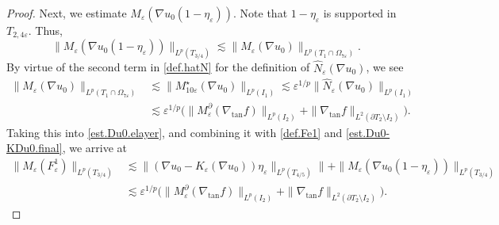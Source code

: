 \documentclass[reqno,12pt]{amsart} %
\theoremstyle{definition}
\theoremstyle{remark}
\numberwithin{equation}{section}
\newcommand{\e}{\varepsilon}
\begin{document}
\begin{proof}
Next, we estimate $M_\e(\nabla u_0(1-\eta_\e))$. Note that $1-\eta_\e$ is supported in 
$T_{2,4\e}$. Thus,
\begin{equation}\label{est.Du0.elayer}
\| M_\e(\nabla u_0(1-\eta_\e)) \|_{L^p(T_{3/4})} \lesssim \| M_\e(\nabla u_0) \|_{L^p(T_{1} \cap \Omega_{7\e})}.
\end{equation}
By virtue of the second term in \eqref{def.hatN} for the definition of $\widehat{N}_\e(\nabla u_0)$, we see
\begin{equation}\label{est.MeDu0Lp}
\begin{aligned}
    \| M_\e(\nabla u_0) \|_{L^p(T_{1} \cap \Omega_{7\e})} & \lesssim \| M_{10\e}^\star(\nabla u_0) \|_{L^p(I_1)} \lesssim \e^{1/p} \| \widehat{N}_\e(\nabla u_0) \|_{L^p(I_1)} \\
    & \lesssim \e^{1/p} \big( \| M_\e^\partial(\nabla_{\tan} f) \|_{L^p(I_2)} + \| \nabla_{\tan} f \|_{L^2(\partial T_2 \setminus I_2)} \big).
\end{aligned}
\end{equation}
Taking this into \eqref{est.Du0.elayer}, and combining it with \eqref{def.Fe1} and \eqref{est.Du0-KDu0.final}, we arrive at
\begin{equation}\label{est.Fe1}
\begin{aligned}
    \| M_\e(F_\e^1) \|_{L^p(T_{3/4})} & \lesssim \| (\nabla u_0 - K_\e(\nabla u_0)) \eta_\e \|_{L^p(T_{4/5})} \| + \| M_\e(\nabla u_0(1-\eta_\e)) \|_{L^p(T_{3/4})} \\
    & \lesssim \e^{1/p} \big( \| M_\e^\partial(\nabla_{\tan} f) \|_{L^p(I_2)} + \| \nabla_{\tan} f \|_{L^2(\partial T_2 \setminus I_2)} \big).
\end{aligned}
\end{equation}


\end{proof}
\end{document}
